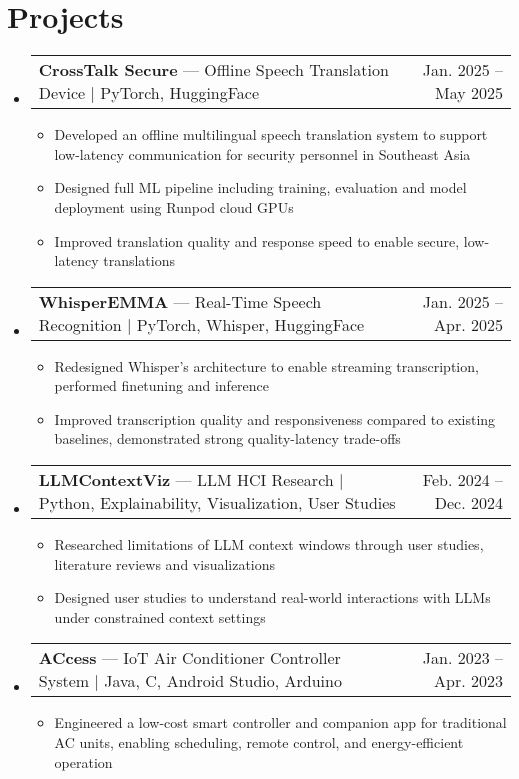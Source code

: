 \documentclass[letterpaper,11pt]{article}
\makeatletter
\newcommand{\resumeItem}[1]{
  \item\small{
    {#1 \vspace{-2pt}}
  }
}
\newcommand{\resumeProjectHeading}[2]{
    \item
    \begin{tabular*}{0.97\textwidth}{l@{\extracolsep{\fill}}r}
      \small#1 & \textnormal{\small #2} \\
    \end{tabular*}\vspace{-7pt}
}
\newcommand{\resumeSubHeadingListStart}{\begin{itemize}[leftmargin=0.15in, label={}]}
\newcommand{\resumeSubHeadingListEnd}{\end{itemize}}
\newcommand{\resumeItemListStart}{\begin{itemize}}
\newcommand{\resumeItemListEnd}{\end{itemize}\vspace{-5pt}}
\makeatother
\begin{document}
\section{Projects}
    \resumeSubHeadingListStart
      \resumeProjectHeading
          {\textbf{CrossTalk Secure} --- Offline Speech Translation Device $|$ PyTorch, HuggingFace}{Jan. 2025 -- May 2025}
          \resumeItemListStart
            \resumeItem{Developed an offline multilingual speech translation system to support low-latency communication for security personnel in Southeast Asia}
            \resumeItem{Designed full ML pipeline including training, evaluation and model deployment using Runpod cloud GPUs}
            \resumeItem{Improved translation quality and response speed to enable secure, low-latency translations}
          \resumeItemListEnd

      \resumeProjectHeading
          {\textbf{WhisperEMMA} --- Real-Time Speech Recognition $|$ PyTorch, Whisper, HuggingFace}{Jan. 2025 -- Apr. 2025}
          \resumeItemListStart
            \resumeItem{Redesigned Whisper's architecture to enable streaming transcription, performed finetuning and inference}
            \resumeItem{Improved transcription quality and responsiveness compared to existing baselines, demonstrated strong quality-latency trade-offs}
          \resumeItemListEnd
    
      \resumeProjectHeading
          {\textbf{LLMContextViz} --- LLM HCI Research $|$ Python, Explainability, Visualization, User Studies}{Feb. 2024 -- Dec. 2024}
          \resumeItemListStart
            \resumeItem{Researched limitations of LLM context windows through user studies, literature reviews and visualizations}
            \resumeItem{Designed user studies to understand real-world interactions with LLMs under constrained context settings}
          \resumeItemListEnd

      \resumeProjectHeading
          {\textbf{ACcess} --- IoT Air Conditioner Controller System $|$ Java, C, Android Studio, Arduino}{Jan. 2023 -- Apr. 2023}
          \resumeItemListStart
            \resumeItem{Engineered a low-cost smart controller and companion app for traditional AC units, enabling scheduling, remote control, and energy-efficient operation}
          \resumeItemListEnd
    \resumeSubHeadingListEnd

\end{document}
